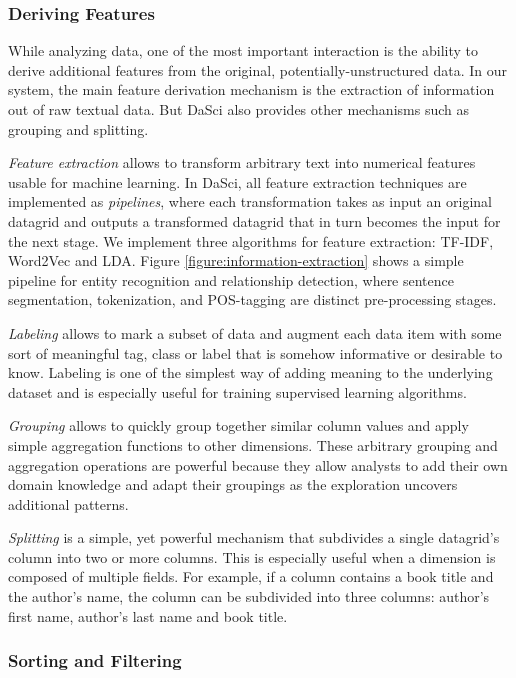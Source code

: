 \documentclass[10pt, a4paper, twocolumn]{article} %
\begin{document}
  
\subsubsection*{Deriving Features}

While analyzing data, one of the most important interaction is the ability to derive additional features from the original, potentially-unstructured data. In our system, the main feature derivation mechanism is the extraction of information out of raw textual data.
But DaSci also provides other mechanisms such as grouping and splitting.

\textit{Feature extraction} allows to transform arbitrary text into numerical features usable for machine learning. 
In DaSci, all feature extraction techniques are implemented as \textit{pipelines}, where each transformation takes as input an original datagrid and outputs a transformed datagrid that in turn becomes the input for the next stage.
We implement three algorithms for feature extraction: TF-IDF, Word2Vec and LDA.
Figure \ref{figure:information-extraction} shows a simple pipeline for entity recognition and relationship detection, where sentence segmentation, tokenization, and POS-tagging are distinct pre-processing stages.

\textit{Labeling} allows to mark a subset of data and augment each data item with some sort of meaningful tag, class or label that is somehow informative or desirable to know. Labeling is one of the simplest way of adding meaning to the underlying dataset and is especially useful for training supervised learning algorithms.

\textit{Grouping} allows to quickly group together similar column values and apply simple aggregation functions to other dimensions.
These arbitrary grouping and aggregation operations are powerful because they allow analysts to add their own domain knowledge and adapt their groupings as the exploration uncovers additional patterns.

\textit{Splitting} is a simple, yet powerful mechanism that subdivides a single datagrid's column into two or more columns. This is especially useful when a dimension is composed of multiple fields. For example, if a column contains a book title and the author's name, the column can be subdivided into three columns: author's first name, author's last name and book title.


\subsubsection*{Sorting and Filtering}
\end{document}
